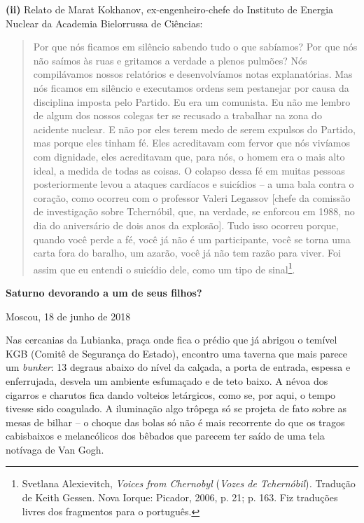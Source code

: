 \textbf{(ii)} Relato de Marat Kokhanov, ex-engenheiro-chefe do Instituto
de Energia Nuclear da Academia Bielorrussa de Ciências:

\begin{quote}
Por que nós ficamos em silêncio sabendo tudo o que sabíamos? Por que nós
não saímos às ruas e gritamos a verdade a plenos pulmões? Nós
compilávamos nossos relatórios e desenvolvíamos notas explanatórias. Mas
nós ficamos em silêncio e executamos ordens sem pestanejar por causa da
disciplina imposta pelo Partido. Eu era um comunista. Eu não me lembro
de algum dos nossos colegas ter se recusado a trabalhar na zona do
acidente nuclear. E não por eles terem medo de serem expulsos do
Partido, mas porque eles tinham fé. Eles acreditavam com fervor que nós
vivíamos com dignidade, eles acreditavam que, para nós, o homem era o
mais alto ideal, a medida de todas as coisas. O colapso dessa fé em
muitas pessoas posteriormente levou a ataques cardíacos e suicídios -- a
uma bala contra o coração, como ocorreu com o professor Valeri Legassov
{[}chefe da comissão de investigação sobre Tchernóbil, que, na verdade,
se enforcou em 1988, no dia do aniversário de dois anos da explosão{]}.
Tudo isso ocorreu porque, quando você perde a fé, você já não é um
participante, você se torna uma carta fora do baralho, um azarão, você
já não tem razão para viver. Foi assim que eu entendi o suicídio dele,
como um tipo de sinal\footnote{Svetlana Alexievitch, \emph{Voices from
  Chernobyl} (\emph{Vozes de Tchernóbil})\emph{.} Tradução de Keith
  Gessen. Nova Iorque: Picador, 2006, p. 21; p. 163. Fiz traduções
  livres dos fragmentos para o português.}.
\end{quote}

\textbf{Saturno devorando a um de seus filhos?}

Moscou, 18 de junho de 2018

Nas cercanias da Lubianka, praça onde fica o prédio que já abrigou o
temível KGB (Comitê de Segurança do Estado), encontro uma taverna que
mais parece um \emph{bunker}: 13 degraus abaixo do nível da calçada, a
porta de entrada, espessa e enferrujada, desvela um ambiente esfumaçado
e de teto baixo. A névoa dos cigarros e charutos fica dando volteios
letárgicos, como se, por aqui, o tempo tivesse sido coagulado. A
iluminação algo trôpega só se projeta de fato sobre as mesas de bilhar
-- o choque das bolas só não é mais recorrente do que os tragos
cabisbaixos e melancólicos dos bêbados que parecem ter saído de uma tela
notívaga de Van Gogh.

